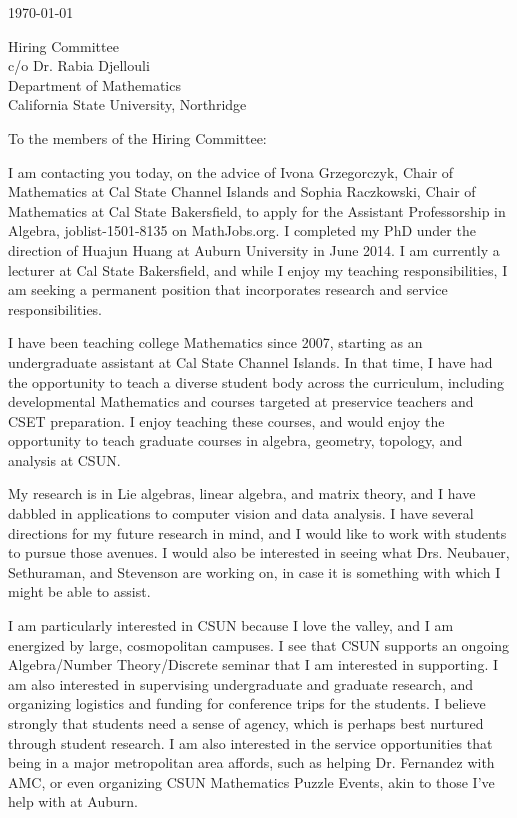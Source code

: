 \documentclass[11pt]{article}
\begin{document}
\makeletterhead

\vfill

\today

\vfill

Hiring Committee\\
c/o Dr. Rabia Djellouli\\
Department of Mathematics\\
California State University, Northridge

\vfill

To the members of the Hiring Committee:

\vfill

I am contacting you today, on the advice of Ivona Grzegorczyk, Chair of
Mathematics at Cal State Channel Islands and Sophia Raczkowski, Chair of
Mathematics at Cal State Bakersfield, to apply for the Assistant
Professorship in Algebra, joblist-1501-8135 on MathJobs.org. I completed
my PhD under the direction of Huajun Huang at Auburn University in June
2014. I am currently a lecturer at Cal State Bakersfield, and while I
enjoy my teaching responsibilities, I am seeking a permanent position
that incorporates research and service responsibilities.

I have been teaching college Mathematics since 2007, starting as an
undergraduate assistant at Cal State Channel Islands. In that time, I
have had the opportunity to teach a diverse student body across the
curriculum, including developmental Mathematics and courses targeted at
preservice teachers and CSET preparation. I enjoy teaching these
courses, and would enjoy the opportunity to teach graduate courses in
algebra, geometry, topology, and analysis at CSUN.

My research is in Lie algebras, linear algebra, and matrix theory, and I
have dabbled in applications to computer vision and data analysis. I
have several directions for my future research in mind, and I would like
to work with students to pursue those avenues. I would also be
interested in seeing what Drs. Neubauer, Sethuraman, and Stevenson are
working on, in case it is something with which I might be able to
assist.

I am particularly interested in CSUN because I love the valley, and I am
energized by large, cosmopolitan campuses. I see that CSUN supports an
ongoing Algebra/Number Theory/Discrete seminar that I am interested in
supporting. I am also interested in supervising undergraduate and
graduate research, and organizing logistics and funding for conference
trips for the students. I believe strongly that students need a sense of
agency, which is perhaps best nurtured through student research. I am
also interested in the service opportunities that being in a major
metropolitan area affords, such as helping Dr. Fernandez with AMC, or
even organizing CSUN Mathematics Puzzle Events, akin to those I've help
with at Auburn.
\end{document}
